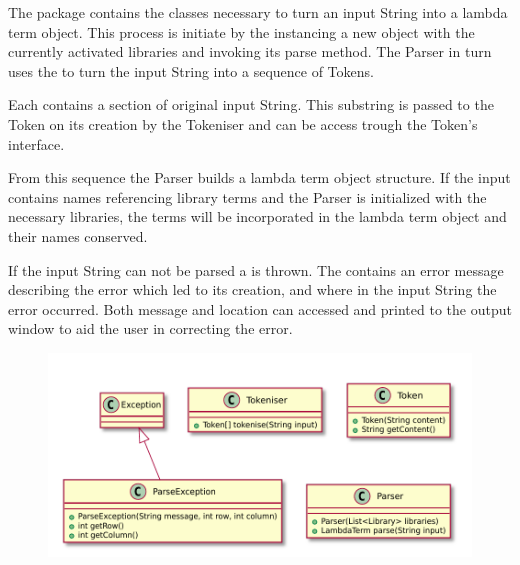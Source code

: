 The \texttt{} package contains the classes necessary to turn an input String into a lambda term object.
This process is initiate by the \texttt{} instancing a new \texttt{} object with the currently activated libraries and invoking its parse method. The Parser in turn uses the \texttt{} to turn the input String into a sequence of Tokens. 

Each \texttt{} contains a section of original input String. This substring is passed to the Token on its creation by the Tokeniser and can be access trough the Token's interface.

From this sequence the Parser builds a lambda term object structure.
If the input contains names referencing library terms and the Parser is initialized with the necessary libraries, the terms will be incorporated in the lambda term object and their names conserved.
 
If the input String can not be parsed a \texttt{} is thrown.
The \texttt{} contains an error message describing the error which led to its creation, and where in the input String the error occurred.
Both message and location can accessed and printed to the output window to aid the user in correcting the error.

\begin{figure}[H]
	\centering
	\includegraphics[width=\textwidth]{packageDiagrams/parsingPackage}
\end{figure}
